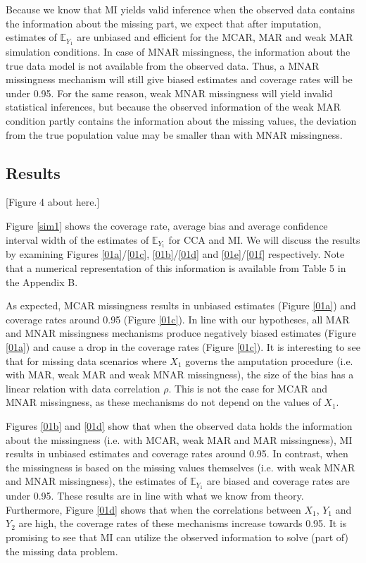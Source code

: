 \documentclass[]{interact}
\begin{document}
Because we know that MI yields valid inference when the observed data contains the information about the missing part, we expect that after imputation, estimates of $\mathbb{E}_{Y_1}$ are unbiased and efficient for the MCAR, MAR and weak MAR simulation conditions. In case of MNAR missingness, the information about the true data model is not available from the observed data. Thus, a MNAR missingness mechanism will still give biased estimates and coverage rates will be under 0.95. For the same reason, weak MNAR missingness will yield invalid statistical inferences, but because the observed information of the weak MAR condition partly contains the information about the missing values, the deviation from the true population value may be smaller than with MNAR missingness. 

\subsection{Results}

[Figure 4 about here.]

Figure \ref{sim1} shows the coverage rate, average bias and average confidence interval width of the estimates of $\mathbb{E}_{Y_1}$ for CCA and MI. We will discuss the results by examining Figures \ref{01a}/\ref{01c}, \ref{01b}/\ref{01d} and \ref{01e}/\ref{01f} respectively. Note that a numerical representation of this information is available from Table 5 in the Appendix B. 

As expected, MCAR missingness results in unbiased estimates (Figure \ref{01a}) and coverage rates around 0.95 (Figure \ref{01c}). In line with our hypotheses, all MAR and MNAR missingness mechanisms produce negatively biased estimates (Figure \ref{01a}) and cause a drop in the coverage rates (Figure \ref{01c}). It is interesting to see that for missing data scenarios where $X_1$ governs the amputation procedure (i.e. with MAR, weak MAR and weak MNAR missingness), the size of the bias has a linear relation with data correlation $\rho$. This is not the case for MCAR and MNAR missingness, as these mechanisms do not depend on the values of $X_1$. 

Figures \ref{01b} and \ref{01d} show that when the observed data holds the information about the missingness (i.e. with MCAR, weak MAR and MAR missingness), MI results in unbiased estimates and coverage rates around 0.95. In contrast, when the missingness is based on the missing values themselves (i.e. with weak MNAR and MNAR missingness), the estimates of $\mathbb{E}_{Y_1}$ are biased and coverage rates are under 0.95. These results are in line with what we know from theory. Furthermore, Figure \ref{01d} shows that when the correlations between $X_1$, $Y_1$ and $Y_2$ are high, the coverage rates of these mechanisms increase towards 0.95. It is promising to see that MI can utilize the observed information to solve (part of) the missing data problem. 
\end{document}
